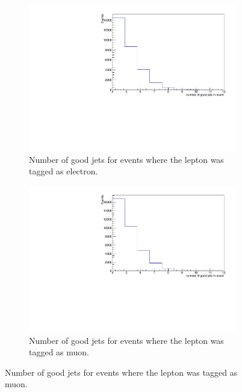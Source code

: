 \begin{figure}[H]%
  \begin{subfigure}{0.48\textwidth}%
    \centering%
    \includegraphics[width=\textwidth]{plots/ttbar_distributions/ttbar.el_jet_good.pdf}%
    \caption{Number of good jets for events where the lepton was tagged as electron.}%
    \label{fig:3a}%
  \end{subfigure}%
  \hfill
  \begin{subfigure}{0.48\textwidth}%
    \centering%
    \includegraphics[width=\textwidth]{plots/ttbar_distributions/ttbar.mu_jet_good.pdf}%
    \caption{Number of good jets for events where the lepton was tagged as muon.}%
    \label{fig:3b}%
  \end{subfigure}%


\end{figure}
